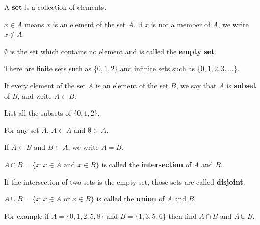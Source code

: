 \documentclass[../calc1-main.tex]{subfiles}
\begin{document}
A \textbf{set} is a collection of elements.

$x\in A$ means $x$ is an element of the set $A$.
If $x$ is not a member of $A$, we write $x\notin A$.

$\emptyset$ is the set which contains no element and is called the \textbf{empty set}.

There are finite sets such as $\{0,1,2\}$ and infinite sets such as $\{0,1,2,3,...\}$.

If every element of the set $A$ is an element of the set $B$, we say that $A$ is \textbf{subset} of $B$, and write $A\subset B$.

\begin{example}
  List all the subsets of $\{0,1,2\}$.
\end{example}

For any set $A$, $A\subset A$ and $\emptyset \subset A$.

If $A\subset B$ and $B\subset A$, we write $A=B$.

$A\cap B = \{x:x\in A \text{ and } x\in B\}$ is called the \textbf{intersection} of $A$ and $B$.
\begin{center}
\end{center}

If the intersection of two sets is the empty set, those sets are called \textbf{disjoint}.

$A\cup B=\{x:x\in A \text{ or } x\in B\}$ is called the \textbf{union} of $A$ and $B$.
\begin{center}
\end{center}

\begin{example}
For example if $A=\{0,1,2,5,8\}$ and $B=\{1,3,5,6\}$ then find $A\cap B$ and $A\cup B$.
\end{example}
\end{document}
